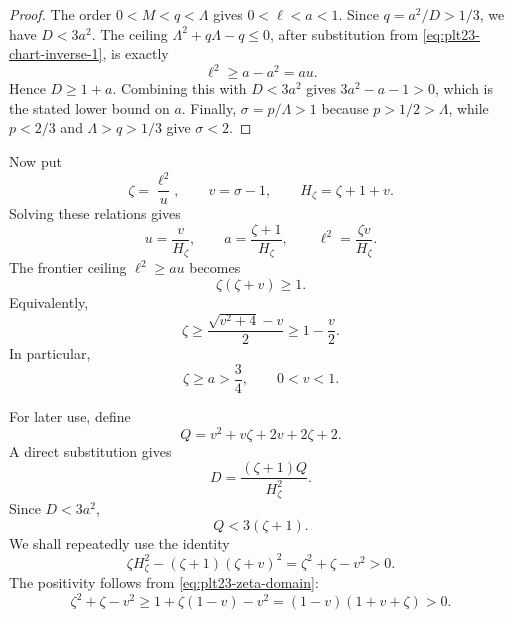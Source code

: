 \documentclass[11pt]{article}
\numberwithin{equation}{section}
\begin{document}
\begin{proof}
  The order $0<M<q<\Lambda$ gives $0<\ell<a<1$.
  Since $q=a^2/D>1/3$, we have $D<3a^2$.
  The ceiling $\Lambda^2+q\Lambda-q\le0$, after substitution from \eqref{eq:plt23-chart-inverse-1}, is exactly
  \[
    \ell^2\ge a-a^2=au.
  \]
  Hence $D\ge1+a$.
  Combining this with $D<3a^2$ gives $3a^2-a-1>0$, which is the stated lower bound on $a$.
  Finally, $\sigma=p/\Lambda>1$ because $p>1/2>\Lambda$, while $p<2/3$ and $\Lambda>q>1/3$ give $\sigma<2$.
\end{proof}

Now put
\begin{equation}\label{eq:plt23-zeta-v-def}
  \zeta=\frac{\ell^2}{u},
  \qquad v=\sigma-1,
  \qquad H_\zeta=\zeta+1+v.
\end{equation}
Solving these relations gives
\begin{equation}\label{eq:plt23-zeta-v-inverse}
  u=\frac {v}{H_\zeta},
  \qquad
  a=\frac{\zeta+1}{H_\zeta},
  \qquad
  \ell^2=\frac{\zeta v}{H_\zeta}.
\end{equation}
The frontier ceiling $\ell^2\ge au$ becomes
\begin{equation}\label{eq:plt23-zeta-domain}
  \zeta(\zeta+v)\ge1.
\end{equation}
Equivalently,
\begin{equation}\label{eq:plt23-zeta-simple-lower}
  \zeta\ge\frac{\sqrt{v^2+4}-v}{2}\ge1-\frac {v}{2}.
\end{equation}
In particular,
\begin{equation}\label{eq:plt23-zeta-lower}
  \zeta\ge a>\frac{3}{4},
  \qquad 0<v<1.
\end{equation}

For later use, define
\begin{equation}\label{eq:plt23-Q-chart}
  Q=v^2+v\zeta+2v+2\zeta+2.
\end{equation}
A direct substitution gives
\begin{equation}\label{eq:plt23-D-Q}
  D=\frac{(\zeta+1)Q}{H_\zeta^2}.
\end{equation}
Since $D<3a^2$,
\begin{equation}\label{eq:plt23-Q-upper}
  Q<3(\zeta+1).
\end{equation}
We shall repeatedly use the identity
\begin{equation}\label{eq:plt23-H-identity}
  \zeta H_\zeta^2-(\zeta+1)(\zeta+v)^2
  =\zeta^2+\zeta-v^2>0.
\end{equation}
The positivity follows from \eqref{eq:plt23-zeta-domain}:
\[
  \zeta^2+\zeta-v^2
  \ge1+\zeta(1-v)-v^2
  =(1-v)(1+v+\zeta)>0.
\]
\end{document}
